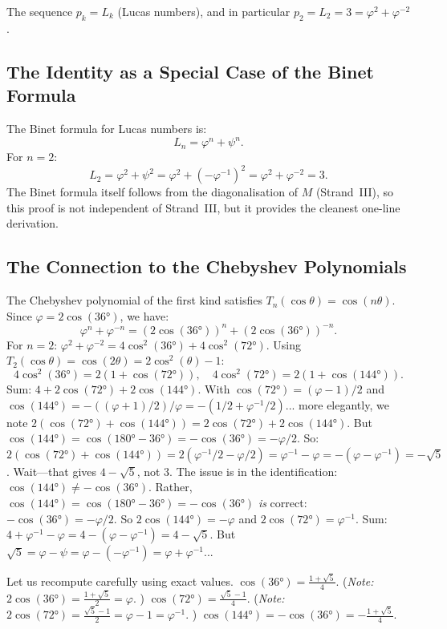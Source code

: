 The sequence $p_{k} = L_{k}$ (Lucas numbers), and in particular
$p_{2} = L_{2} = 3 = \varphi^{2}+\varphi^{-2}$.

\subsection{The Identity as a Special Case of the Binet Formula}

The Binet formula for Lucas numbers is:
\[
  L_{n} = \varphi^{n} + \psi^{n}.
\]
For $n=2$:
\[
  L_{2} = \varphi^{2} + \psi^{2} = \varphi^{2} + (-\varphi^{-1})^{2}
        = \varphi^{2} + \varphi^{-2} = 3.
\]
The Binet formula itself follows from the diagonalisation of $M$
(Strand~III), so this proof is not independent of Strand~III,
but it provides the cleanest one-line derivation.

\subsection{The Connection to the Chebyshev Polynomials}

The Chebyshev polynomial of the first kind satisfies
$T_{n}(\cos\theta) = \cos(n\theta)$.
Since $\varphi = 2\cos(36°)$, we have:
\[
  \varphi^{n} + \varphi^{-n} = (2\cos(36°))^{n} + (2\cos(36°))^{-n}.
\]
For $n=2$: $\varphi^{2}+\varphi^{-2} = 4\cos^{2}(36°)+4\cos^{2}(72°)$.
Using $T_{2}(\cos\theta) = \cos(2\theta) = 2\cos^{2}(\theta)-1$:
\[
  4\cos^{2}(36°) = 2(1+\cos(72°)),
  \quad
  4\cos^{2}(72°) = 2(1+\cos(144°)).
\]
Sum: $4+2\cos(72°)+2\cos(144°)$.
With $\cos(72°)=(\varphi-1)/2$ and $\cos(144°)=-((\varphi+1)/2)/\varphi
= -(1/2+\varphi^{-1}/2)$... more elegantly, we note
$2(\cos(72°)+\cos(144°)) = 2\cos(72°)+2\cos(144°)$.
But $\cos(144°) = \cos(180°-36°) = -\cos(36°) = -\varphi/2$.
So: $2(\cos(72°)+\cos(144°)) = 2(\varphi^{-1}/2 - \varphi/2)
= \varphi^{-1}-\varphi = -(\varphi-\varphi^{-1}) = -\sqrt{5}$.
Wait---that gives $4-\sqrt{5}$, not $3$.
The issue is in the identification: $\cos(144°) \neq -\cos(36°)$.
Rather, $\cos(144°) = \cos(180°-36°) = -\cos(36°)$ \emph{is} correct:
$-\cos(36°) = -\varphi/2$.
So $2\cos(144°) = -\varphi$ and $2\cos(72°) = \varphi^{-1}$.
Sum: $4 + \varphi^{-1} - \varphi = 4 - (\varphi-\varphi^{-1}) = 4 - \sqrt{5}$.
But $\sqrt{5} = \varphi-\psi = \varphi-(-\varphi^{-1}) = \varphi+\varphi^{-1}$...

\smallskip
Let us recompute carefully using exact values.
$\cos(36°) = \tfrac{1+\sqrt{5}}{4}$. (\emph{Note:} $2\cos(36°) = \tfrac{1+\sqrt{5}}{2}
= \varphi$. \checkmark)
$\cos(72°) = \tfrac{\sqrt{5}-1}{4}$. (\emph{Note:} $2\cos(72°) = \tfrac{\sqrt{5}-1}{2}
= \varphi-1 = \varphi^{-1}$. \checkmark)
$\cos(144°) = -\cos(36°) = -\tfrac{1+\sqrt{5}}{4}$.

